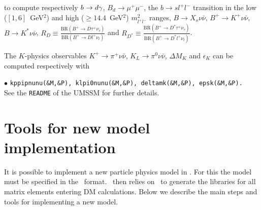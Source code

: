 \documentclass[12pt,a4paper]{article}
\begin{document}
\noindent to compute respectively $b\rightarrow d\gamma$,  $B_d\to \mu^+\mu^-$, the $b \to s l^+l^-$ transition in the low ($[1,6]$~GeV$^2$) and high ($\geq14.4$~GeV$^2$) $m^2_{l^+l^-}$ ranges, $B \to X_s\nu\bar{\nu}$, $B^+ \to K^+\nu\bar{\nu}$, $B \to K^*\nu\bar{\nu}$, $R_D \equiv \frac{\textrm{BR}(B^+ \to D\tau^+\nu_{\tau})}{\textrm{BR}(B^+ \to Dl^+\nu_{l})}$ and 
$R_{D^*} \equiv \frac{\textrm{BR}(B^+ \to D^*\tau^+\nu_{\tau})}{\textrm{BR}(B^+ \to D^*l^+\nu_{l})}$.

The $K$-physics observables $K^+ \to \pi^+\nu\bar{\nu}$, $K_L \to \pi^0 \nu\bar{\nu}$, $\Delta M_K$ and $\epsilon_K$ can be computed respectively with

\noindent
$\bullet$ {\tt kppipnunu(\&M,\&P), klpi0nunu(\&M,\&P), deltamk(\&M,\&P), epsk(\&M,\&P).}\\ 

\noindent
See the \verb|README| of the UMSSM for further details.


\section{Tools for new model implementation}
\label{sec:newmodel}

It is possible to  implement a new particle physics  model  in \micro.
For this the model must be specified in the
\calchep\ format. \micro\ then relies on \calchep\ 
to generate the libraries for all matrix elements entering DM calculations. 
Below we describe the main steps and tools for implementing a new model.
\end{document}
